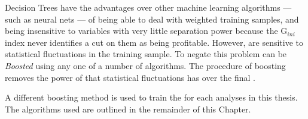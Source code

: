 Decision Trees have the advantages over other machine learning algorithms ---
such as neural nets --- of being able to deal with weighted training samples, and being insensitive
to variables with very little separation power because the
$\mathrm{G}_{ini}$ index never identifies a cut on them as being profitable.
However, \DTs are sensitive to statistical fluctuations in the training sample.
To negate this problem \DTs can be \emph{Boosted} using any one of a number of algorithms.
The procedure of boosting removes the power of that statistical fluctuations has over the final
\BDT.

A different boosting method is used to train the \BDT for each analyses in this thesis.
The algorithms used are outlined in the remainder of this Chapter.


